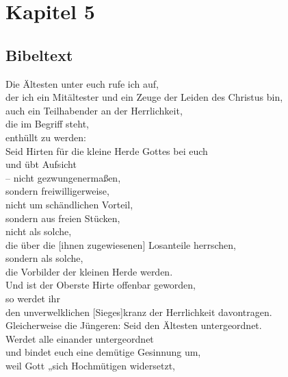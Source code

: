 \section{Kapitel 5}
\subsection{Bibeltext}

    Die Ältesten unter euch rufe ich auf, \\
        der ich ein Mitältester und ein Zeuge der Leiden des Christus bin, \\
        auch ein Teilhabender an der Herrlichkeit, \\
        die im Begriff steht, \\
        enthüllt zu werden:\\
            Seid Hirten für die kleine Herde Gottes bei euch \\
                und übt Aufsicht \\
                – nicht gezwungenermaßen, \\
                    sondern freiwilligerweise, \\
                nicht um schändlichen Vorteil, \\
                    sondern aus freien Stücken,\\
                nicht als solche, \\
                die über die [ihnen zugewiesenen] Losanteile herrschen, \\
                    sondern als solche, \\
                        die Vorbilder der kleinen Herde werden.\\
                Und ist der Oberste Hirte offenbar geworden, \\
                    so werdet ihr \\
                        den unverwelklichen [Sieges]kranz der Herrlichkeit davontragen. \\
    Gleicherweise die Jüngeren: Seid den Ältesten untergeordnet. \\
        Werdet alle einander untergeordnet \\
            und bindet euch eine demütige Gesinnung um, \\
                weil Gott „sich Hochmütigen widersetzt, \\
